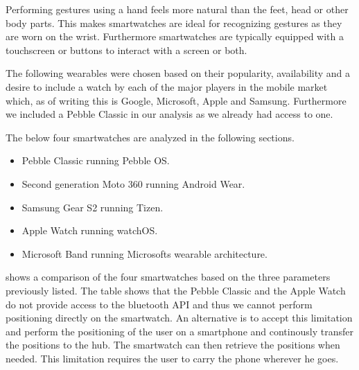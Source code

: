 Performing gestures using a hand feels more natural than the feet, head or other body parts. This makes smartwatches are ideal for recognizing gestures as they are worn on the wrist. Furthermore smartwatches are typically equipped with a touchscreen or buttons to interact with a screen or both.

The following wearables were chosen based on their popularity, availability and a desire to include a watch by each of the major players in the mobile market which, as of writing this is Google, Microsoft, Apple and Samsung. Furthermore we included a Pebble Classic in our analysis as we already had access to one.

The below four smartwatches are analyzed in the following sections.

\begin{itemize}
\item Pebble Classic running Pebble OS.
\item Second generation Moto 360 running Android Wear.
\item Samsung Gear S2 running Tizen.
\item Apple Watch running watchOS.
\item Microsoft Band running Microsofts wearable architecture.
\end{itemize}

 shows a comparison of the four smartwatches based on the three parameters previously listed. The table shows that the Pebble Classic and the Apple Watch do not provide access to the bluetooth API and thus we cannot perform positioning directly on the smartwatch. An alternative is to accept this limitation and perform the positioning of the user on a smartphone and continously transfer the positions to the hub. The smartwatch can then retrieve the positions when needed.
This limitation requires the user to carry the phone wherever he goes.

